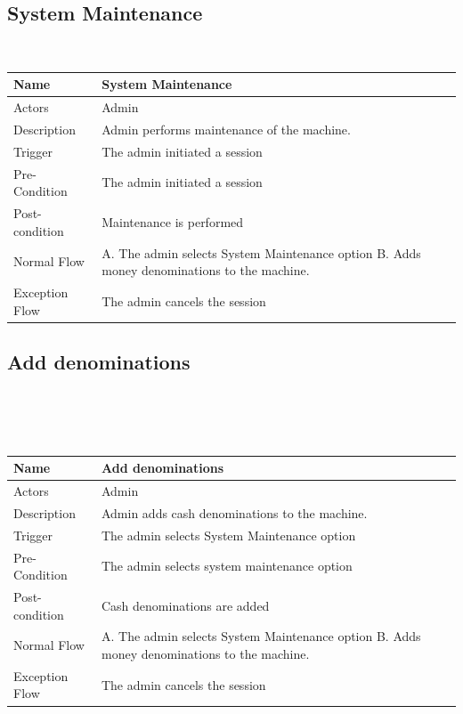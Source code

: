 \documentclass{article}
\begin{document}
{\subsection{System Maintenance}
\hskip1cm\
\begin{tabular}{|p{3cm}|p{6cm}|}
    \hline
    Name & System Maintenance\\
    \hline
    Actors & Admin\\
    \hline
    Description & Admin performs maintenance of the machine.\\
    \hline
    Trigger & The admin initiated a session\\
    \hline
    Pre-Condition & The admin initiated a session\\
    \hline
    Post-condition & Maintenance is performed\\
    \hline
    Normal Flow &
        A. The admin selects System Maintenance option\newline
        B. Adds money denominations to the machine.\\
    \hline
    Exception Flow &  The admin cancels the session\\
    \hline
\end{tabular}
\subsection{Add denominations}
\\\
\\\
\hskip1cm\
\begin{tabular}{|p{3cm}|p{6cm}|}
    \hline
    Name & Add denominations\\
    \hline
    Actors & Admin\\
    \hline
    Description & Admin adds cash denominations to the machine.\\
    \hline
    Trigger & The admin selects System Maintenance option\\
    \hline
    Pre-Condition & The admin selects system maintenance option\\
    \hline
    Post-condition & Cash denominations are added\\
    \hline
    Normal Flow &
        A. The admin selects System Maintenance option\newline
        B. Adds money denominations to the machine.\\
    \hline
Exception Flow &  The admin cancels the session\\
\hline
\end{tabular}
\newpage
}
\end{document}
